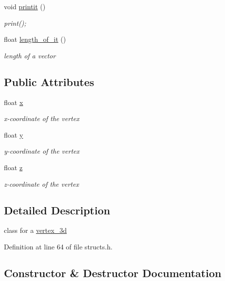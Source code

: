 \begin{DoxyCompactItemize}
void \hyperlink{classvertex__3d_a6dd76e77097d6bcf7fa124a9951d631d}{printit} ()
\begin{DoxyCompactList}\small\item\em print(); \end{DoxyCompactList}\item 
float \hyperlink{classvertex__3d_a9762b3e926a8b7aca495abc685b30432}{length\+\_\+of\+\_\+it} ()
\begin{DoxyCompactList}\small\item\em length of a vector \end{DoxyCompactList}\end{DoxyCompactItemize}
\subsection*{Public Attributes}
\begin{DoxyCompactItemize}
\item 
float \hyperlink{classvertex__3d_a3f42c81ecbe6cab86cda63854c7799c8}{x}
\begin{DoxyCompactList}\small\item\em x-\/coordinate of the vertex \end{DoxyCompactList}\item 
float \hyperlink{classvertex__3d_a44d8a3570860630dc76bfa0817786a9b}{y}
\begin{DoxyCompactList}\small\item\em y-\/coordinate of the vertex \end{DoxyCompactList}\item 
float \hyperlink{classvertex__3d_a9028d1e6317552f63d6cbd57ff5a42ba}{z}
\begin{DoxyCompactList}\small\item\em z-\/coordinate of the vertex \end{DoxyCompactList}\end{DoxyCompactItemize}


\subsection{Detailed Description}
class for a \hyperlink{classvertex__3d}{vertex\+\_\+3d} 

Definition at line 64 of file structs.\+h.



\subsection{Constructor \& Destructor Documentation}
